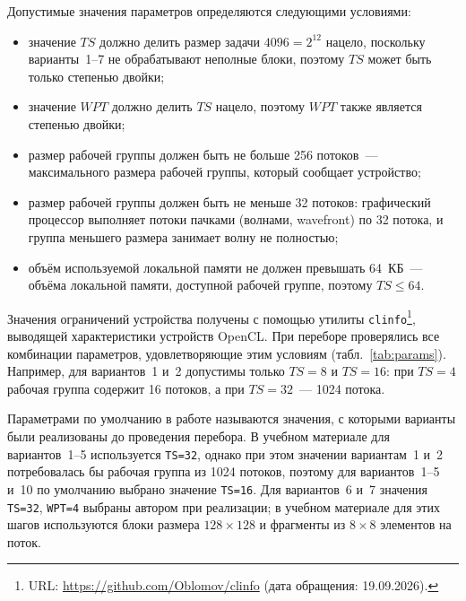 \documentclass[a4paper]{article}
\begin{document}
Допустимые значения параметров определяются следующими условиями:
\begin{itemize}
    \item значение $TS$ должно делить размер задачи $4096 = 2^{12}$
    нацело, поскольку варианты~1--7 не обрабатывают неполные блоки,
    поэтому $TS$ может быть только степенью двойки;
    \item значение $WPT$ должно делить $TS$ нацело, поэтому $WPT$ также
    является степенью двойки;
    \item размер рабочей группы должен быть не больше 256 потоков~---
    максимального размера рабочей группы, который сообщает устройство;
    \item размер рабочей группы должен быть не меньше 32 потоков:
    графический процессор выполняет потоки пачками (волнами, wavefront)
    по 32 потока, и группа меньшего размера занимает волну не
    полностью;
    \item объём используемой локальной памяти не должен превышать
    64~КБ~--- объёма локальной памяти, доступной рабочей группе, поэтому
    $TS \le 64$.
\end{itemize}
Значения ограничений устройства получены с помощью утилиты
\texttt{clinfo}\footnote{URL: \url{https://github.com/Oblomov/clinfo}
(дата обращения: 19.09.2026).}, выводящей характеристики устройств
OpenCL. При переборе проверялись все комбинации параметров,
удовлетворяющие этим условиям (табл.~\ref{tab:params}). Например,
для вариантов~1 и~2 допустимы только $TS=8$ и $TS=16$: при $TS=4$
рабочая группа содержит 16 потоков, а при $TS=32$~--- 1024 потока.

Параметрами по умолчанию в работе называются значения, с которыми
варианты были реализованы до проведения перебора. В учебном материале
для вариантов~1--5 используется \texttt{TS=32}, однако при этом
значении вариантам~1 и~2 потребовалась бы рабочая группа из 1024
потоков, поэтому для вариантов~1--5 и~10 по умолчанию выбрано значение
\texttt{TS=16}. Для вариантов~6 и~7 значения \texttt{TS=32},
\texttt{WPT=4} выбраны автором при реализации; в учебном материале
для этих шагов используются блоки размера $128 \times 128$ и фрагменты
из $8 \times 8$ элементов на поток.
\end{document}
